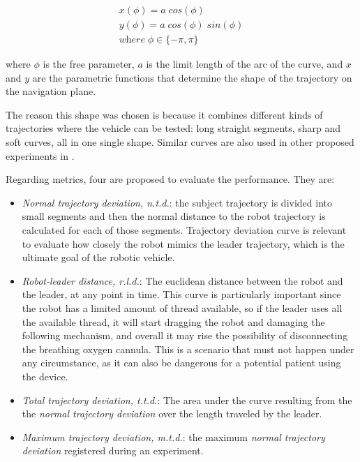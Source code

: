\documentclass[journal]{IEEEtran}
\begin{document}
\begin{equation}
\begin{array}{ll}  
 x( \phi ) = a \; cos( \phi )     \\
 y( \phi ) = a \; cos ( \phi )   \; sin ( \phi )    \\ 
 \textit{where}  \; \phi \in \lbrace -\pi , \pi  \rbrace
\end{array}
\label{eq:lemniscate}
\end{equation}

\noindent where $ \phi $ is the free parameter, $a$ is the limit length of the arc of the curve, and $x$ and $y$ are the parametric functions that determine the shape of the trajectory on the navigation plane.

The reason  this shape was chosen is because it combines different kinds of trajectories where the vehicle can be tested: long straight segments, sharp and soft curves, all in one single shape. Similar curves are also used in other proposed experiments in \cite{Neto2015,Endo2015}.  

Regarding metrics, four are proposed to evaluate the performance.  They are:

\begin{itemize}
    \item \textit{Normal trajectory deviation, n.t.d.}: the subject trajectory is divided into small segments and then the normal distance to the robot trajectory is calculated for each of those segments. Trajectory deviation curve is relevant to evaluate how closely the robot mimics the leader trajectory, which is the ultimate goal of the robotic vehicle. 
    \item \textit{Robot-leader distance, r.l.d.}: The euclidean distance between the robot and the leader, at any point in time. This curve is particularly important since the robot has a limited amount of thread available, so if the leader uses all the available thread, it will start dragging the robot and damaging the following mechanism, and overall it may rise the possibility of disconnecting the breathing oxygen cannula. This is a scenario that must not happen under any circumstance, as it can also be dangerous for a potential patient using the device. 
    \item \textit{Total trajectory deviation, t.t.d.}: The area under the curve resulting from the the \textit{normal trajectory deviation} over the length traveled by the leader.
    \item \textit{Maximum trajectory deviation, m.t.d.}: the maximum \textit{normal trajectory deviation} registered during an experiment.    
\end{itemize}{}
\end{document}
